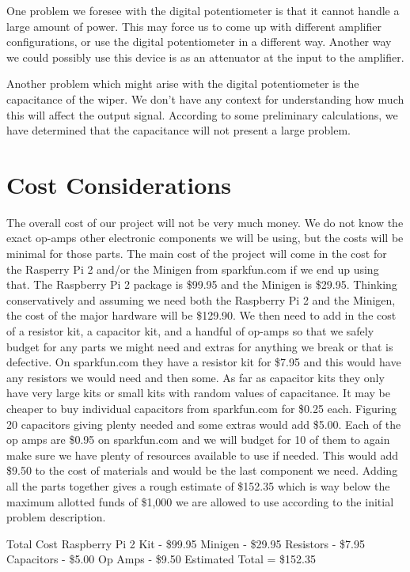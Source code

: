 \documentclass{article}	%
\begin{document}
\begin{multicols}{2}
One problem we foresee with the digital potentiometer is that it cannot handle a large amount of power. This may force us to come up with different amplifier configurations, or use the digital potentiometer in a different way. Another way we could possibly use this device is as an attenuator at the input to the amplifier.

Another problem which might arise with the digital potentiometer is the capacitance of the wiper. We don’t have any context for understanding how much this will affect the output signal. According to some preliminary calculations, we have determined that the capacitance will not present a large problem.

\section{Cost Considerations}
The overall cost of our project will not be very much money. We do not know the exact op-amps other electronic components we will be using, but the costs will be minimal for those parts. The main cost of the project will come in the cost for the Rasperry Pi 2 and/or the Minigen from sparkfun.com if we end up using that. The Raspberry Pi 2 package is \$99.95 and the Minigen is \$29.95. Thinking conservatively and assuming we need both the Raspberry Pi 2 and the Minigen, the cost of the major hardware will be \$129.90. We then need to add in the cost of a resistor kit, a capacitor kit, and a handful of op-amps so that we safely budget for any parts we might need and extras for anything we break or that is defective. On sparkfun.com they have a resistor kit for \$7.95 and this would have any resistors we would need and then some. As far as capacitor kits they only have very large kits or small kits with random values of capacitance. It may be cheaper to buy individual capacitors from sparkfun.com for \$0.25 each. Figuring 20 capacitors giving plenty needed and some extras would add \$5.00. Each of the op amps are \$0.95 on sparkfun.com and we will budget for 10 of them to again make sure we have plenty of resources available to use if needed. This would add \$9.50 to the cost of materials and would be the last component we need. Adding all the parts together gives a rough estimate of \$152.35 which is way below the maximum allotted funds of \$1,000 we are allowed to use according to the initial problem description.

Total Cost
Raspberry Pi 2 Kit - \$99.95
Minigen - \$29.95
Resistors - \$7.95
Capacitors - \$5.00
Op Amps - \$9.50
Estimated Total = \$152.35


\end{multicols}
\end{document}
